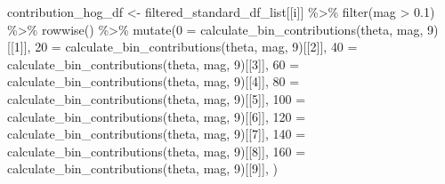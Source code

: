 \documentclass[
  letterpaper,
  DIV=11,
  numbers=noendperiod]{scrreprt}
\newenvironment{Shaded}{\begin{snugshade}}{\end{snugshade}}
\newcommand{\AttributeTok}[1]{\textcolor[rgb]{0.40,0.45,0.13}{#1}}
\newcommand{\DecValTok}[1]{\textcolor[rgb]{0.68,0.00,0.00}{#1}}
\newcommand{\FloatTok}[1]{\textcolor[rgb]{0.68,0.00,0.00}{#1}}
\newcommand{\FunctionTok}[1]{\textcolor[rgb]{0.28,0.35,0.67}{#1}}
\newcommand{\NormalTok}[1]{\textcolor[rgb]{0.00,0.23,0.31}{#1}}
\newcommand{\OtherTok}[1]{\textcolor[rgb]{0.00,0.23,0.31}{#1}}
\newcommand{\SpecialCharTok}[1]{\textcolor[rgb]{0.37,0.37,0.37}{#1}}
\newcommand{\StringTok}[1]{\textcolor[rgb]{0.13,0.47,0.30}{#1}}
\begin{document}
\begin{Shaded}
\begin{Highlighting}[]
\NormalTok{  contribution\_hog\_df }\OtherTok{\textless{}{-}} 
\NormalTok{    filtered\_standard\_df\_list[[i]] }\SpecialCharTok{\%\textgreater{}\%}
    \FunctionTok{filter}\NormalTok{(mag }\SpecialCharTok{\textgreater{}} \FloatTok{0.1}\NormalTok{) }\SpecialCharTok{\%\textgreater{}\%}
    \FunctionTok{rowwise}\NormalTok{() }\SpecialCharTok{\%\textgreater{}\%}
    \FunctionTok{mutate}\NormalTok{(}\StringTok{\textasciigrave{}}\AttributeTok{0}\StringTok{\textasciigrave{}} \OtherTok{=} \FunctionTok{calculate\_bin\_contributions}\NormalTok{(theta, mag, }\DecValTok{9}\NormalTok{)[[}\DecValTok{1}\NormalTok{]],}
           \StringTok{\textasciigrave{}}\AttributeTok{20}\StringTok{\textasciigrave{}} \OtherTok{=} \FunctionTok{calculate\_bin\_contributions}\NormalTok{(theta, mag, }\DecValTok{9}\NormalTok{)[[}\DecValTok{2}\NormalTok{]],}
           \StringTok{\textasciigrave{}}\AttributeTok{40}\StringTok{\textasciigrave{}} \OtherTok{=} \FunctionTok{calculate\_bin\_contributions}\NormalTok{(theta, mag, }\DecValTok{9}\NormalTok{)[[}\DecValTok{3}\NormalTok{]],}
           \StringTok{\textasciigrave{}}\AttributeTok{60}\StringTok{\textasciigrave{}} \OtherTok{=} \FunctionTok{calculate\_bin\_contributions}\NormalTok{(theta, mag, }\DecValTok{9}\NormalTok{)[[}\DecValTok{4}\NormalTok{]],}
           \StringTok{\textasciigrave{}}\AttributeTok{80}\StringTok{\textasciigrave{}} \OtherTok{=} \FunctionTok{calculate\_bin\_contributions}\NormalTok{(theta, mag, }\DecValTok{9}\NormalTok{)[[}\DecValTok{5}\NormalTok{]],}
           \StringTok{\textasciigrave{}}\AttributeTok{100}\StringTok{\textasciigrave{}} \OtherTok{=} \FunctionTok{calculate\_bin\_contributions}\NormalTok{(theta, mag, }\DecValTok{9}\NormalTok{)[[}\DecValTok{6}\NormalTok{]],}
           \StringTok{\textasciigrave{}}\AttributeTok{120}\StringTok{\textasciigrave{}} \OtherTok{=} \FunctionTok{calculate\_bin\_contributions}\NormalTok{(theta, mag, }\DecValTok{9}\NormalTok{)[[}\DecValTok{7}\NormalTok{]],}
           \StringTok{\textasciigrave{}}\AttributeTok{140}\StringTok{\textasciigrave{}} \OtherTok{=} \FunctionTok{calculate\_bin\_contributions}\NormalTok{(theta, mag, }\DecValTok{9}\NormalTok{)[[}\DecValTok{8}\NormalTok{]],}
           \StringTok{\textasciigrave{}}\AttributeTok{160}\StringTok{\textasciigrave{}} \OtherTok{=} \FunctionTok{calculate\_bin\_contributions}\NormalTok{(theta, mag, }\DecValTok{9}\NormalTok{)[[}\DecValTok{9}\NormalTok{]],}
\NormalTok{           )}
  

\end{Highlighting}
\end{Shaded}
\end{document}
